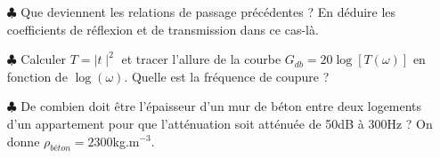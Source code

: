 \documentclass{report}
\begin{document}
\begin{itemize}
	
	\item[$\clubsuit$] Que deviennent les relations de passage précédentes ? En déduire les coefficients de réflexion et de transmission dans ce cas-là. 
	
	\item[$\clubsuit$] Calculer $T=\mid t\mid^2$ et tracer l'allure de la courbe $G_{db}=20\log\left[T(\omega) \right]$ en fonction de $\log(\omega)$. Quelle est la fréquence de coupure ?
	
	\item[$\clubsuit$] De combien doit être l'épaisseur d'un mur de béton entre deux logements d'un appartement pour que l'atténuation soit atténuée de 50dB à 300Hz ? On donne $\rho_{béton}=2300$kg.m$^{-3}$. 
	
\end{itemize}
\end{document}
